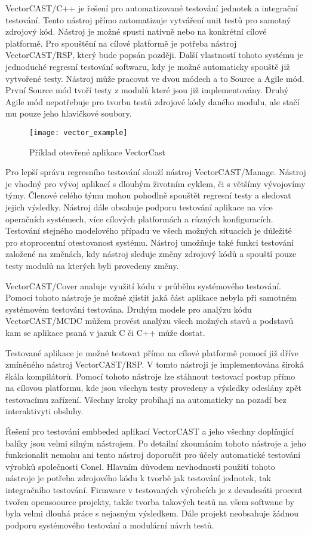 VectorCAST/C++ je řešení pro automatizované testování jednotek a integrační testování. Tento nástroj přímo automatizuje vytváření unit testů pro samotný zdrojový kód. Nástroj je možné spusti nativně nebo na konkrétní cílové platformě. Pro spouštění na cílové platformě je potřeba nástroj VectorCAST/RSP, který bude popsán později. Další vlastností tohoto systému je jednoduché regresní testování softwaru, kdy je možné automaticky spouště již vytvořené testy. Nástroj může pracovat ve dvou módech a to Source a Agile mód. První Source mód tvoří testy z modulů které jsou již implementovány. Druhý Agile mód nepotřebuje pro tvorbu testů zdrojové kódy daného modulu, ale stačí mu pouze jeho hlavičkové soubory.

\begin{figure}[h]
  \centering
  \texttt{[image: vector\_example]}
  \caption{Příklad otevřené aplikace VectorCast}
  \label{fig:vector_example}
\end{figure}

Pro lepší správu regresního testování slouží nástroj VectorCAST/Manage. Nástroj je vhodný pro vývoj aplikací s dlouhým životním cyklem, či s většímy vývojovímy týmy. Členové celého týmu mohou pohodlně spouštět regresní testy a sledovat jejich výsledky. Nástroj dále obsahuje podporu testování aplikace na více operačních systémech, více cílových platformách a různých konfiguracích. Testování stejného modelového případu ve všech možných situacích je důležité pro stoprocentní otestovanost systému. Nástroj umožňuje také funkci testování založené na změnách, kdy nástroj sleduje změny zdrojový kódů a spouští pouze testy modulů na kterých byli provedeny změny.

VectorCAST/Cover analuje využití kódu v průběhu systémového testování. Pomocí tohoto nástroje je možné zjistit jaká část aplikace nebyla při samotném systémovém testování testována. Druhým modele pro analýzu kódu VectorCAST/MCDC můžem provést analýzu všech možných stavů a podstavů kam se aplikace psaná v jazuk C či C++ může dostat.

Testované aplikace je možné testovat přímo na cílové platformě pomocí již dříve zmíněného nástroj VectorCAST/RSP. V tomto nástroji je implementována široká škála kompilátorů. Pomocí tohoto nástroje lze stáhnout testovací postup přímo na cílovou platformu, kde jsou všechyn testy provedeny a výsledky odeslány zpět testovacímu zařízení. Všechny kroky probíhají na automaticky na pozadí bez interaktivyti obsluhy.

Řešení pro testování embbeded aplikací VectorCAST a jeho všechny doplňující balíky jsou velmi silným nástrojem. Po detailní zkoumáním tohoto nástroje a jeho funkcionalit nemohu ani tento nástroj doporučit pro účely automatické testování výrobků společnosti Conel. Hlavním důvodem nevhodnosti použití tohoto nástroje je potřeba zdrojového kódu k tvorbě jak testování jednotek, tak integračního testování. Firmware v testovaných výrobcích je z devadesáti procent tvořen opensoource projekty, takže tvorba takových testů na všem softwaue by byla velmi dlouhá práce s nejasným výsledkem. Dále projekt neobsahuje žádnou podporu systémového testování a modulární návrh testů.

